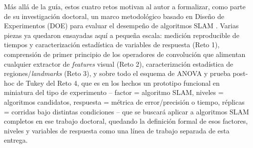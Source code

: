 \documentclass[11pt]{article}
\begin{document}
Más allá de la guía, estos cuatro retos motivan al autor a formalizar, como
parte de su investigación doctoral, un marco metodológico basado en Diseño
de Experimentos (DOE) \citep{montgomery2019design} para evaluar el
desempeño de algoritmos SLAM \citep{cadena2016past,murartal2017orbslam2}.
Varias piezas ya quedaron ensayadas aquí a pequeña escala: medición
reproducible de tiempos y caracterización estadística de variables de
respuesta (Reto 1), comprensión de primer principio de los operadores de
convolución que alimentan cualquier extractor de \emph{features} visual
(Reto 2), caracterización estadística de regiones/\emph{landmarks}
(Reto 3), y sobre todo el esquema de ANOVA y prueba post-hoc de Tukey del
Reto 4, que es en los hechos un prototipo funcional en miniatura del tipo
de experimento -- factor = algoritmo SLAM, niveles = algoritmos candidatos,
respuesta = métrica de error/precisión o tiempo, réplicas = corridas bajo
distintas condiciones -- que se buscará aplicar a algoritmos SLAM
completos en ese trabajo doctoral, quedando la definición formal de esos
factores, niveles y variables de respuesta como una línea de trabajo
separada de esta entrega.



\end{document}
